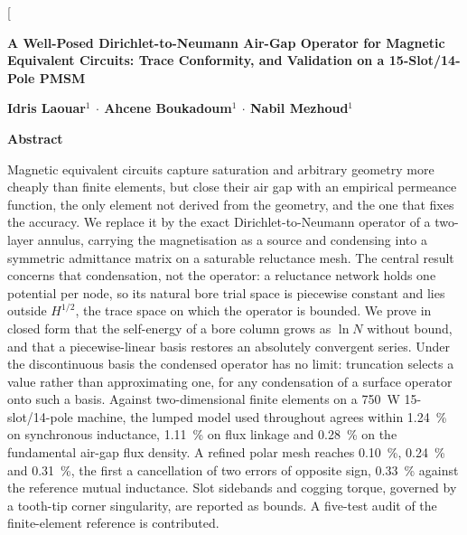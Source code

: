 \documentclass[10pt,a4paper,twocolumn]{article}
\theoremstyle{plain}
\theoremstyle{remark}
\begin{document}
\twocolumn[
\begin{center}
{\rmfamily\bfseries\fontsize{15}{19}\selectfont
A Well-Posed Dirichlet-to-Neumann Air-Gap Operator for Magnetic
Equivalent Circuits: Trace Conformity, and Validation on a
15-Slot/14-Pole PMSM\par}
\vspace{7mm}
{\rmfamily\bfseries\fontsize{10}{13}\selectfont
Idris Laouar$^{1}$ $\cdot$ Ahcene Boukadoum$^{1}$ $\cdot$ Nabil Mezhoud$^{1}$\par}
\end{center}
\vspace{6mm}

{\rmfamily\bfseries Abstract}\par\vspace{2pt}
Magnetic equivalent circuits capture saturation and arbitrary geometry more
cheaply than finite elements, but close their air gap with an empirical
permeance function, the only element not derived from the geometry, and the
one that fixes the accuracy. We replace it by the exact Dirichlet-to-Neumann
operator of a two-layer annulus, carrying the magnetisation as a source and
condensing into a symmetric admittance matrix on a saturable reluctance
mesh. The central result concerns that condensation, not the operator: a
reluctance network holds one potential per node, so its natural bore trial
space is piecewise constant and lies outside $H^{1/2}$, the trace space on
which the operator is bounded. We prove in closed form that the self-energy
of a bore column grows as $\ln N$ without bound, and that a
piecewise-linear basis restores an absolutely convergent series. Under the
discontinuous basis the condensed operator has no limit: truncation selects
a value rather than approximating one, for any condensation of a surface
operator onto such a basis. Against two-dimensional finite elements on a
\SI{750}{\watt} 15-slot/14-pole machine, the lumped model used throughout
agrees within \SI{1.24}{\percent} on synchronous inductance,
\SI{1.11}{\percent} on flux linkage and \SI{0.28}{\percent} on the
fundamental air-gap flux density. A refined polar mesh reaches
\SI{0.10}{\percent}, \SI{0.24}{\percent} and \SI{0.31}{\percent}, the first
a cancellation of two errors of opposite sign, \SI{0.33}{\percent} against
the reference mutual inductance. Slot sidebands and cogging torque, governed
by a tooth-tip corner singularity, are reported as bounds. A five-test audit
of the finite-element reference is contributed.
\vspace{4mm}
\end{document}
